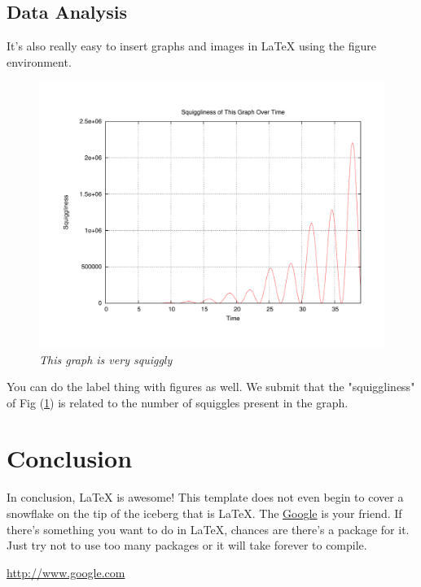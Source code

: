 \pagebreak
\subsection{Data Analysis}
\par It's also really easy to insert graphs and images in \LaTeX\; using the 
figure environment. \\

\begin{figure}[H] %
\begin{center}
\includegraphics[scale=.55]{squiggliness.pdf} %
\caption{\small \emph{This graph is very squiggly}} 
\label{squiggly} %
\end{center}
\end{figure}

You can do the label thing with figures as well. We submit that the "squiggliness" 
of Fig (\ref{squiggly}) is related to the number of squiggles present in the graph.

\pagebreak
\section{Conclusion}
\par In conclusion, \LaTeX\; is awesome! This template does not even begin to 
cover a snowflake on the tip of the iceberg that is \LaTeX. The \url{Google}\cite{thegoogle} 
is your friend. If there's something you want to do in \LaTeX, chances are 
there's a package for it. Just try not to use too many packages or it will take 
forever to compile.


\newpage
\begin{thebibliography}{1}

 \url{http://www.google.com}

\end{thebibliography}


